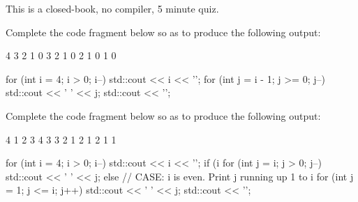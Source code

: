 

This is a closed-book, no compiler, 5 minute quiz.

\nextq
Complete the code fragment below so as to produce the following output:
\begin{console}[fontsize=\small]
4
 3 2 1 0
3
 2 1 0
2
 1 0
1
 0
\end{console}
\ANSWER
\begin{answercode}
for (int i = 4; i > 0; i--)
{
    std::cout << i << '\n';
    for (int j = i - 1; j >= 0; j--)
    {
        std::cout << ' ' << j;
    }
    std::cout << '\n';
}
\end{answercode}

\nextq
Complete the code fragment below so as to produce the following output:
\begin{console}[fontsize=\small]
4
 1 2 3 4
3
 3 2 1
2
 1 2
1
 1
\end{console}
\ANSWER
\begin{answercode}
for (int i = 4; i > 0; i--)
{
    std::cout << i << '\n';
    if (i %
    {
        for (int j = i; j > 0; j--)
        {
            std::cout << ' ' << j;
        }
    }
    else // CASE: i is even. Print j running up 1 to i
    {
        for (int j = 1; j <= i; j++)
        {
            std::cout << ' ' << j;
        }
    }
    std::cout << '\n';
}
\end{answercode}


